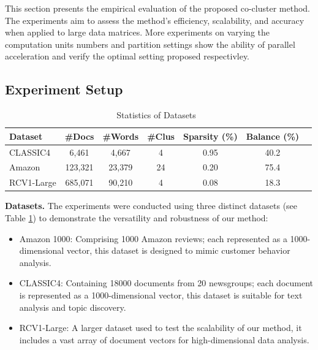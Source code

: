 \documentclass[journal]{IEEEtran}
\renewcommand{\cite}[1]{~\autocite{#1}}
\begin{document}
This section presents the empirical evaluation of the proposed co-cluster method. The experiments aim to assess the method's efficiency, scalability, and accuracy when applied to large data matrices. More experiments on varying the computation units numbers and partition settings show the ability of parallel acceleration and verify the optimal setting proposed respectivley.

\subsection{Experiment Setup}

\begin{table}[h]
  \centering
  \caption{Statistics of Datasets\cite{role2019CoClustPythonPackage}}
  \label{tab:dataset-statistics}
  \begin{tabular}{lccc@{}c@{}c@{}c}
    \hline
    \textbf{Dataset} & \textbf{\#Docs} & \textbf{\#Words} & \textbf{\#Clus} & \textbf{Sparsity (\%)} & \textbf{Balance (\%)} \\
    \hline
    CLASSIC4         & 6,461           & 4,667            & 4               & 0.95                   & 40.2                  \\
    Amazon           & 123,321         & 23,379           & 24              & 0.20                   & 75.4                  \\
    RCV1-Large       & 685,071         & 90,210           & 4               & 0.08                   & 18.3                  \\
    \hline
  \end{tabular}
\end{table}

\textbf{Datasets.}
The experiments were conducted using three distinct datasets (see Table \ref{tab:dataset-statistics}) to demonstrate the versatility and robustness of our method:

\begin{itemize}
  \item Amazon 1000: Comprising 1000 Amazon reviews; each represented as a 1000-dimensional vector, this dataset is designed to mimic customer behavior analysis.
  \item CLASSIC4: Containing 18000 documents from 20 newsgroups; each document is represented as a 1000-dimensional vector, this dataset is suitable for text analysis and topic discovery.
  \item RCV1-Large: A larger dataset used to test the scalability of our method, it includes a vast array of document vectors for high-dimensional data analysis.
\end{itemize}
\end{document}
